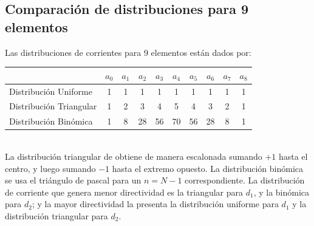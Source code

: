 \documentclass[11pt]{report}
\begin{document}
\subsection{Comparación de distribuciones para 9 elementos}

Las distribuciones de corrientes para 9 elementos están dados por: 

\begin{tabular}{l|c|c|c|c|c|c|c|c|c}
	& $a_0$ & $a_1$ & $a_2$ & $a_3$ & $a_4$ & $a_5$ & $a_6$ & $a_7$ & $a_8$\\ \hline
	Distribución Uniforme 	& 1 & 1 & 1 & 1 & 1 & 1 & 1 & 1 & 1\\
	Distribución Triangular & 1 & 2 & 3 & 4 & 5 & 4 & 3 & 2 & 1\\
	Distribución Binómica 	& 1 & 8 & 28 & 56 & 70 & 56 & 28 & 8 & 1\\
\end{tabular} \\

La distribución triangular de obtiene de manera escalonada sumando $+1$ hasta el centro, y luego sumando $-1$ hasta el extremo opuesto. La distribución binómica se usa el triángulo de pascal para un $n = N - 1$ correspondiente. 
La distribución de corriente que genera menor directividad es la triangular para $d_1$, y la binómica para $d_2$; y la mayor directividad la presenta la distribución uniforme para $d_1$ y la distribución triangular para $d_2$.
\end{document}
